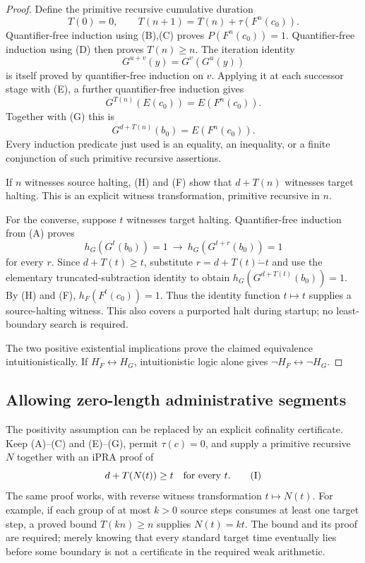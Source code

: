 \begin{proof}
Define the primitive recursive cumulative duration
\[
 T(0)=0,\qquad
 T(n+1)=T(n)+\tau(F^n(c_0)).
\]
Quantifier-free induction using (B),(C) proves $P(F^n(c_0))=1$.
Quantifier-free induction using (D) then proves $T(n)\geq n$.
The iteration identity
\[
 G^{u+v}(y)=G^v(G^u(y))
\]
is itself proved by quantifier-free induction on $v$. Applying it at
each successor stage with (E), a further quantifier-free induction gives
\[
 G^{T(n)}(E(c_0))=E(F^n(c_0)).
\]
Together with (G) this is
\[
 G^{d+T(n)}(b_0)=E(F^n(c_0)).                            \tag{H}
\]
Every induction predicate just used is an equality, an inequality, or a
finite conjunction of such primitive recursive assertions.

If $n$ witnesses source halting, (H) and (F) show that
$d+T(n)$ witnesses target halting. This is an explicit witness
transformation, primitive recursive in $n$.

For the converse, suppose $t$ witnesses target halting. Quantifier-free
induction from (A) proves
\[
 h_G(G^t(b_0))=1\ \longrightarrow\
 h_G(G^{t+r}(b_0))=1
\]
for every $r$. Since $d+T(t)\geq t$, substitute
$r=d+T(t)\mathbin{\dot{-}}t$ and use the elementary truncated-subtraction
identity to obtain $h_G(G^{d+T(t)}(b_0))=1$.
By (H) and (F), $h_F(F^t(c_0))=1$. Thus the identity function
$t\mapsto t$ supplies a source-halting witness. This also covers a
purported halt during startup; no least-boundary search is required.

The two positive existential implications prove the claimed equivalence
intuitionistically. If $H_F\leftrightarrow H_G$, intuitionistic logic
alone gives $\neg H_F\leftrightarrow\neg H_G$.
\end{proof}

\subsection{Allowing zero-length administrative segments}

The positivity assumption can be replaced by an explicit cofinality
certificate. Keep (A)--(C) and (E)--(G), permit $\tau(c)=0$, and supply a
primitive recursive $N$ together with an $\mathrm{iPRA}$ proof of
\[
 d+T(N(t))\geq t\quad\hbox{for every }t.                 \tag{I}
\]
The same proof works, with reverse witness transformation $t\mapsto N(t)$.
For example, if each group of at most $k>0$ source steps consumes at least
one target step, a proved bound $T(kn)\geq n$ supplies $N(t)=kt$.
The bound and its proof are required; merely knowing that every standard
target time eventually lies before some boundary is not a certificate in
the required weak arithmetic.

